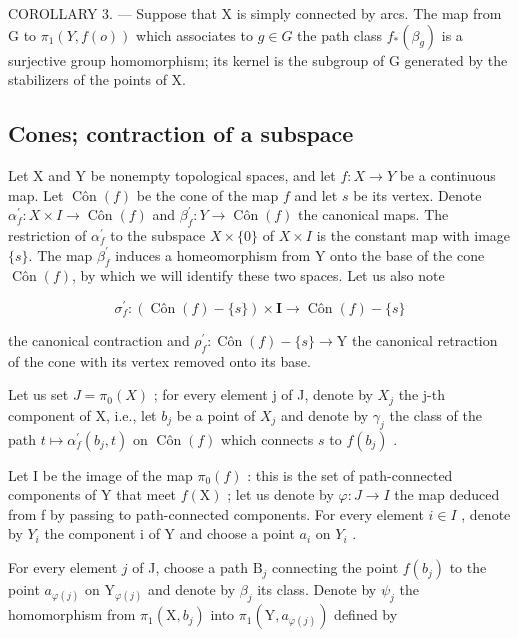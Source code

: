 COROLLARY 3. --- Suppose that X is simply connected by arcs. The map from G to \(\pi_1(Y, f(o))\) which associates to \(g \in G\) the path class \(f_*(\beta_g)\) is a surjective group homomorphism; its kernel is the subgroup of G generated by the stabilizers of the points of X.

\subsection{Cones; contraction of a subspace}

Let X and Y be nonempty topological spaces, and let \(f: X \to Y\) be a continuous map. Let \(\operatorname{Côn}(f)\) be the cone of the map \(f\) and let \(s\) be its vertex. Denote \(\alpha_{f}^{\prime}: X \times I \to \operatorname{Côn}(f)\) and \(\beta_{f}^{\prime}: Y \to \operatorname{Côn}(f)\) the canonical maps. The restriction of \(\alpha_{f}^{\prime}\) to the subspace \(X \times \{0\}\) of \(X \times I\) is the constant map with image \(\{s\}\). The map \(\beta_{f}^{\prime}\) induces a homeomorphism from Y onto the base of the cone \(\operatorname{Côn}(f)\), by which we will identify these two spaces. Let us also note

\[
\sigma_ {f} ^ {\prime} \colon (\operatorname{Côn} (f) - \{s \}) \times \mathbf {I} \to \operatorname{Côn} (f) - \{s \}
\]

the canonical contraction and \(\rho_{f}^{\prime}\colon\operatorname{Côn}(f) - \{s\}\to\mathrm{Y}\) the canonical retraction of the cone with its vertex removed onto its base.

Let us set \(J = \pi_{0}(X)\) ; for every element j of J, denote by \(X_{j}\) the j-th component of X, i.e., let \(b_{j}\) be a point of \(X_{j}\) and denote by \(\gamma_{j}\) the class of the path \(t \mapsto \alpha_{f}^{\prime}(b_{j}, t)\) on \(\operatorname{Côn}(f)\) which connects \(s\) to \(f(b_{j})\) .

Let I be the image of the map \(\pi_{0}(f)\) : this is the set of path-connected components of Y that meet \(f(\mathrm{X})\) ; let us denote by \(\varphi\colon J\to I\) the map deduced from f by passing to path-connected components. For every element \(i\in I\) , denote by \(Y_{i}\) the component i of Y and choose a point \(a_{i}\) on \(Y_{i}\) .

For every element \(j\) of J, choose a path \(\mathrm{B}_{j}\) connecting the point \(f(b_{j})\) to the point \(a_{\varphi(j)}\) on \(\mathrm{Y}_{\varphi(j)}\) and denote by \(\beta_{j}\) its class. Denote by \(\psi_{j}\) the homomorphism from \(\pi_{1}(\mathrm{X},b_{j})\) into \(\pi_{1}(\mathrm{Y},a_{\varphi(j)})\) defined by

